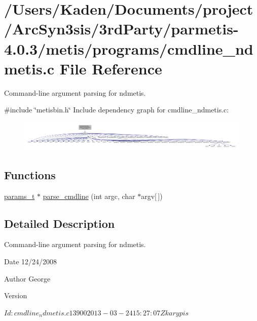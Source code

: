 \hypertarget{a00305}{}\section{/\+Users/\+Kaden/\+Documents/project/\+Arc\+Syn3sis/3rd\+Party/parmetis-\/4.0.3/metis/programs/cmdline\+\_\+ndmetis.c File Reference}
\label{a00305}


Command-\/line argument parsing for ndmetis.  


{\ttfamily \#include \char`\"{}metisbin.\+h\char`\"{}}\newline
Include dependency graph for cmdline\+\_\+ndmetis.\+c\+:\nopagebreak
\begin{figure}[H]
\begin{center}
\leavevmode
\includegraphics[width=350pt]{a00306}
\end{center}
\end{figure}
\subsection*{Functions}
\begin{DoxyCompactItemize}
\item 
\hyperlink{a00706}{params\+\_\+t} $\ast$ \hyperlink{a00305_a0e7ce196a2f8882777957bf898739f6f}{parse\+\_\+cmdline} (int argc, char $\ast$argv\mbox{[}$\,$\mbox{]})
\end{DoxyCompactItemize}


\subsection{Detailed Description}
Command-\/line argument parsing for ndmetis. 

\begin{DoxyDate}{Date}
12/24/2008 
\end{DoxyDate}
\begin{DoxyAuthor}{Author}
George 
\end{DoxyAuthor}
\begin{DoxyVersion}{Version}
\begin{DoxyVerb}$Id: cmdline_ndmetis.c 13900 2013-03-24 15:27:07Z karypis $\end{DoxyVerb}
 
\end{DoxyVersion}


